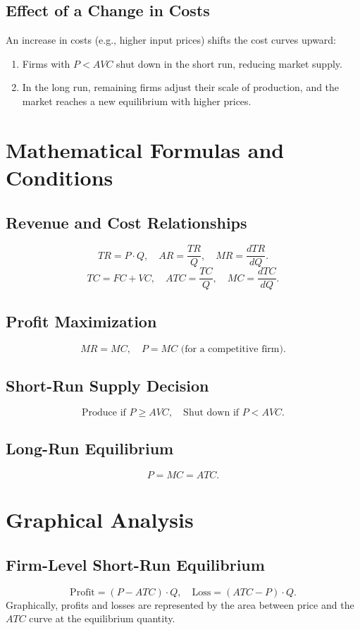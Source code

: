 \subsection*{Effect of a Change in Costs}
An increase in costs (e.g., higher input prices) shifts the cost curves upward:
\begin{enumerate}
    \item Firms with \(P < AVC\) shut down in the short run, reducing market supply.
    \item In the long run, remaining firms adjust their scale of production, and the market reaches a new equilibrium with higher prices.
\end{enumerate}

\section*{Mathematical Formulas and Conditions}
\subsection*{Revenue and Cost Relationships}
\[
TR = P \cdot Q, \quad AR = \frac{TR}{Q}, \quad MR = \frac{dTR}{dQ}.
\]
\[
TC = FC + VC, \quad ATC = \frac{TC}{Q}, \quad MC = \frac{dTC}{dQ}.
\]

\subsection*{Profit Maximization}
\[
MR = MC, \quad P = MC \text{ (for a competitive firm)}.
\]

\subsection*{Short-Run Supply Decision}
\[
\text{Produce if } P \geq AVC, \quad \text{Shut down if } P < AVC.
\]

\subsection*{Long-Run Equilibrium}
\[
P = MC = ATC.
\]

\section*{Graphical Analysis}
\subsection*{Firm-Level Short-Run Equilibrium}
\[
\text{Profit} = (P - ATC) \cdot Q, \quad \text{Loss} = (ATC - P) \cdot Q.
\]
Graphically, profits and losses are represented by the area between price and the \(ATC\) curve at the equilibrium quantity.

